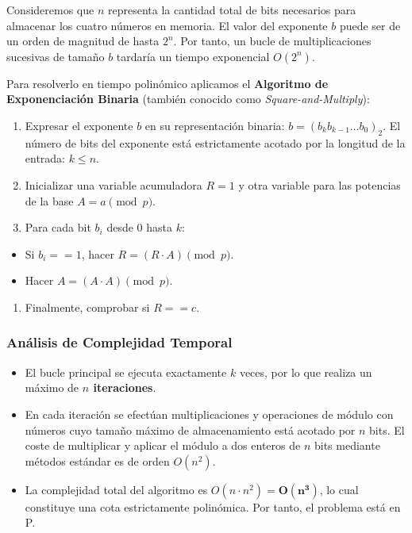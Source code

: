 \documentclass[12pt]{book} %
\providecommand{\tightlist}{%
  \setlength{\itemsep}{0pt}\setlength{\parskip}{0pt}}
\begin{document}
Consideremos que \(n\) representa la cantidad total de bits necesarios
para almacenar los cuatro números en memoria. El valor del exponente
\(b\) puede ser de un orden de magnitud de hasta \(2^n\). Por tanto, un
bucle de multiplicaciones sucesivas de tamaño \(b\) tardaría un tiempo
exponencial \(O(2^n)\).

Para resolverlo en tiempo polinómico aplicamos el \textbf{Algoritmo de
Exponenciación Binaria} (también conocido como
\emph{Square-and-Multiply}):

\begin{enumerate}
\def\labelenumi{\arabic{enumi}.}
\item
  Expresar el exponente \(b\) en su representación binaria:
  \(b = (b_k b_{k-1} \dots b_0)_2\). El número de bits del exponente
  está estrictamente acotado por la longitud de la entrada: \(k \le n\).
\item
  Inicializar una variable acumuladora \(R = 1\) y otra variable para
  las potencias de la base \(A = a \pmod p\).
\item
  Para cada bit \(b_i\) desde \(0\) hasta \(k\):
\end{enumerate}

\begin{itemize}
\tightlist
\item
  Si \(b_i == 1\), hacer \(R = (R \cdot A) \pmod p\).
\item
  Hacer \(A = (A \cdot A) \pmod p\).
\end{itemize}

\begin{enumerate}
\def\labelenumi{\arabic{enumi}.}
\setcounter{enumi}{3}
\tightlist
\item
  Finalmente, comprobar si \(R == c\).
\end{enumerate}

\hypertarget{anuxe1lisis-de-complejidad-temporal}{%
\subsubsection{Análisis de Complejidad
Temporal}\label{anuxe1lisis-de-complejidad-temporal}}

\begin{itemize}
\item
  El bucle principal se ejecuta exactamente \(k\) veces, por lo que
  realiza un máximo de \textbf{\(n\) iteraciones}.
\item
  En cada iteración se efectúan multiplicaciones y operaciones de módulo
  con números cuyo tamaño máximo de almacenamiento está acotado por
  \(n\) bits. El coste de multiplicar y aplicar el módulo a dos enteros
  de \(n\) bits mediante métodos estándar es de orden
  \textbf{\(O(n^2)\)}.
\item
  La complejidad total del algoritmo es
  \(O(n \cdot n^2) = \mathbf{O(n^3)}\), lo cual constituye una cota
  estrictamente polinómica. Por tanto, el problema está en P.
\end{itemize}
\end{document}

